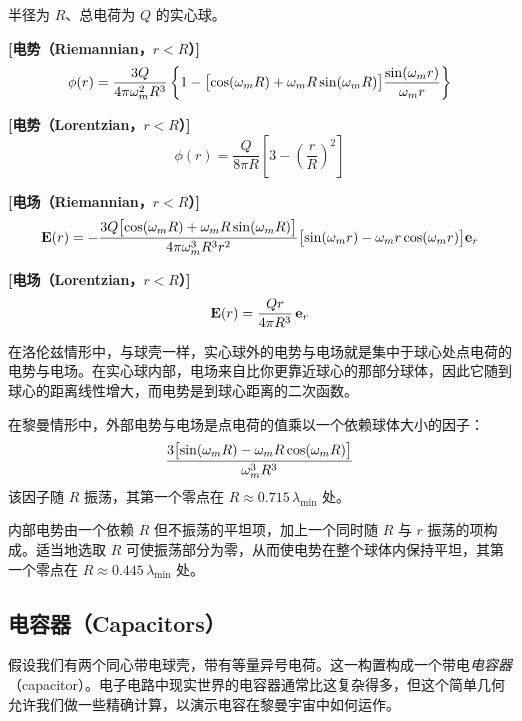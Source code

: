 \begin{keybox}[均匀带电实心球]
半径为 $R$、总电荷为 $Q$ 的实心球。

\textbf{[电势（Riemannian，$r<R$）]}
\begin{equation}
\phi(r) = \frac{3Q}{4\pi\omega_m^{2}R^{3}}
\left\{1 - \bigl[\cos(\omega_m R) + \omega_m R\sin(\omega_m R)\bigr]\frac{\sin(\omega_m r)}{\omega_m r}\right\}
\end{equation}

\textbf{[电势（Lorentzian，$r<R$）]}
\begin{equation}
\phi(r) = \frac{Q}{8\pi R}\left[3 - \left(\frac{r}{R}\right)^{2}\right]
\end{equation}

\textbf{[电场（Riemannian，$r<R$）]}
\begin{equation}
\mathbf{E}(r) = -\frac{3Q\bigl[\cos(\omega_m R) + \omega_m R\sin(\omega_m R)\bigr]}{4\pi\omega_m^{3}R^{3}r^{2}}
\bigl[\sin(\omega_m r) - \omega_m r\cos(\omega_m r)\bigr]\mathbf{e}_{r}
\end{equation}

\textbf{[电场（Lorentzian，$r<R$）]}
\begin{equation}
\mathbf{E}(r) = \frac{Q r}{4\pi R^{3}}\,\mathbf{e}_{r}
\end{equation}
\end{keybox}


在洛伦兹情形中，与球壳一样，实心球外的电势与电场就是集中于球心处点电荷的电势与电场。在实心球内部，电场来自比你更靠近球心的那部分球体，因此它随到球心的距离线性增大，而电势是到球心距离的二次函数。

在黎曼情形中，外部电势与电场是点电荷的值乘以一个依赖球体大小的因子：
\[
\frac{3\bigl[\sin(\omega_m R) - \omega_m R\cos(\omega_m R)\bigr]}{\omega_m^{3}R^{3}}
\]
该因子随 $R$ 振荡，其第一个零点在 $R\approx 0.715\,\lambda_{\min}$ 处。

内部电势由一个依赖 $R$ 但不振荡的平坦项，加上一个同时随 $R$ 与 $r$ 振荡的项构成。适当地选取 $R$ 可使振荡部分为零，从而使电势在整个球体内保持平坦，其第一个零点在 $R\approx 0.445\,\lambda_{\min}$ 处。

\subsection{电容器（Capacitors）}

假设我们有两个同心带电球壳，带有等量异号电荷。这一构置构成一个带电\emph{电容器}（capacitor）。电子电路中现实世界的电容器通常比这复杂得多，但这个简单几何允许我们做一些精确计算，以演示电容在黎曼宇宙中如何运作。


